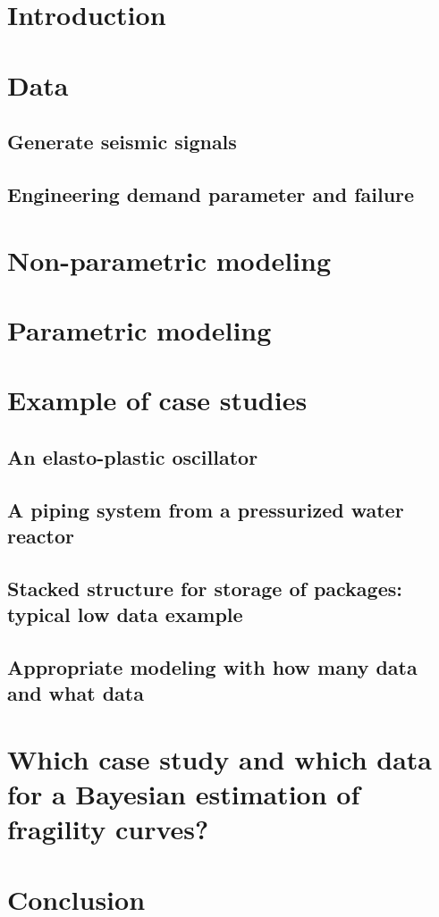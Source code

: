 

\section{Introduction}


\section{Data}

\subsection{Generate seismic signals}

\subsection{Engineering demand parameter and failure}



\section{Non-parametric modeling}




\section{Parametric modeling}





\section{Example of case studies}

    \subsection{An elasto-plastic oscillator}
    
    \subsection{A piping system from a pressurized water reactor}

    \subsection{Stacked structure for storage of packages: typical low data example}


    \subsection{Appropriate modeling with how many data and what data}


\section{Which case study and which data for a Bayesian estimation of fragility curves?}


\section{Conclusion}





